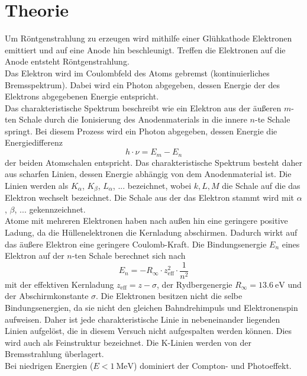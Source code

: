 \section{Theorie}
\label{sec:Theorie}
Um Röntgenstrahlung zu erzeugen wird mithilfe einer Glühkathode Elektronen emittiert und auf eine Anode hin beschleunigt.
Treffen die Elektronen auf die Anode entsteht Röntgenstrahlung.
\\
Das Elektron wird im Coulombfeld des Atoms gebremst (kontinuierliches Bremsspektrum).
Dabei wird ein Photon abgegeben, dessen Energie der des Elektrons abgegebenen Energie entspricht.
\\
Das charakteristische Spektrum beschreibt wie ein Elektron aus der äußeren $m$-ten Schale durch die Ionisierung des Anodenmaterials in die innere $n$-te Schale springt.
Bei diesem Prozess wird ein Photon abgegeben, dessen Energie die Energiedifferenz
\begin{equation}
    h \cdot \nu = E_m - E_n
    \label{eqn:bindungsenergie}
\end{equation}
der beiden Atomschalen entspricht.
Das charakteristische Spektrum besteht daher aus scharfen Linien, dessen Energie abhängig von dem Anodenmaterial ist.
Die Linien werden als $K_\alpha$, $K_\beta$, $L_\alpha$, $...$ bezeichnet, wobei $k, L, M$ die Schale auf die das Elektron wechselt bezeichnet.
Die Schale aus der das Elektron stammt wird mit $\alpha$, $\beta$, $...$ gekennzeichnet.
\\
Atome mit mehreren Elektronen haben nach außen hin eine geringere positive Ladung, da die Hüllenelektronen die Kernladung abschirmen.
Dadurch wirkt auf das äußere Elektron eine geringere Coulomb-Kraft.
Die Bindungsenergie $E_n$ eines Elektron auf der $n$-ten Schale berechnet sich nach
\begin{equation*}
    E_n = - R_\infty \cdot z_\text{eff}^2 \cdot \frac{1}{n^2}
\end{equation*}
mit der effektiven Kernladung $z_\text{eff} = z - \sigma$, der Rydbergenergie $R_\infty = \SI{13.6}{\electronvolt}$ und der Abschirmkonstante $\sigma$.
Die Elektronen besitzen nicht die selbe Bindungsenergien, da sie nicht den gleichen Bahndrehimpuls und Elektronenspin aufweisen.
Daher ist jede charakteristische Linie in nebeneinander liegenden Linien aufgelöst, die in diesem Versuch nicht aufgespalten werden können.
Dies wird auch als Feinstruktur bezeichnet.
Die K-Linien werden von der Bremsstrahlung überlagert.
\\
Bei niedrigen Energien ($E < \SI{1}{\mega\electronvolt}$) dominiert der Compton- und Photoeffekt.
